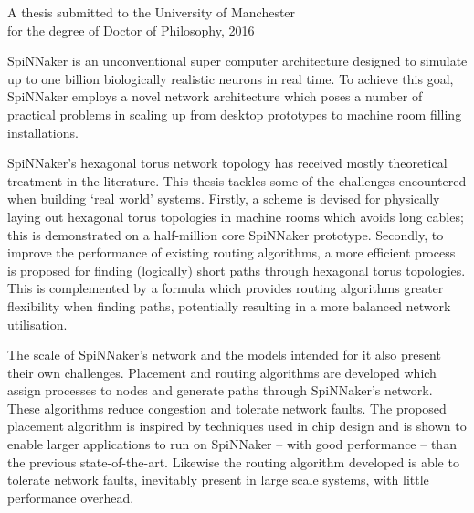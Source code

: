 {
	
	
	
	\vfill
	
	\begin{center}
		\textsc{\large\thesistitle}
		
		\vspace{0.5em}
		
		\thesisauthor
		
		\vspace{0.5em}
		
		A thesis submitted to the University of Manchester\\
		for the degree of Doctor of Philosophy, 2016
	\end{center}
	
	\vfill
	
	
	SpiNNaker is an unconventional super computer architecture designed to
	simulate up to one billion biologically realistic neurons in real time. To
	achieve this goal, SpiNNaker employs a novel network architecture which poses
	a number of practical problems in scaling up from desktop prototypes to
	machine room filling installations.
	
	SpiNNaker's hexagonal torus network topology has received mostly theoretical
	treatment in the literature. This thesis tackles some of the challenges
	encountered when building `real world' systems.  Firstly, a scheme is devised
	for physically laying out hexagonal torus topologies in machine rooms which
	avoids long cables; this is demonstrated on a half-million core SpiNNaker
	prototype.  Secondly, to improve the performance of existing routing
	algorithms, a more efficient process is proposed for finding (logically)
	short paths through hexagonal torus topologies. This is complemented by a
	formula which provides routing algorithms greater flexibility when finding
	paths, potentially resulting in a more balanced network utilisation.
	
	The scale of SpiNNaker's network and the models intended for it also present
	their own challenges. Placement and routing algorithms are developed which
	assign processes to nodes and generate paths through SpiNNaker's network.
	These algorithms reduce congestion and tolerate network faults. The proposed
	placement algorithm is inspired by techniques used in chip design and is
	shown to enable larger applications to run on SpiNNaker -- with good
	performance -- than the previous state-of-the-art. Likewise the routing
	algorithm developed is able to tolerate network faults, inevitably present in
	large scale systems, with little performance overhead.
	
	
	\par%
}
